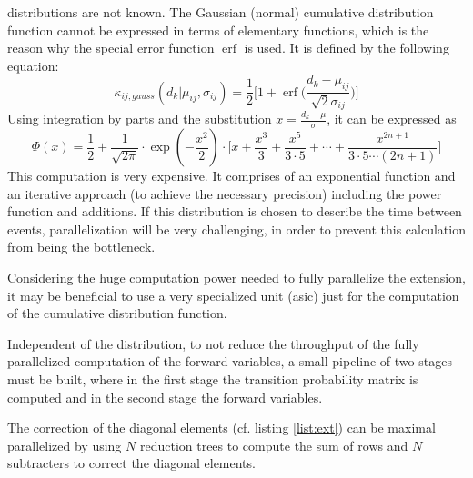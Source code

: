 \documentclass[mscthesis]{usiinfthesis}
\DeclareMathOperator{\erf}{erf}
\begin{document}
\begin{description}
        distributions are not known. The Gaussian (normal) cumulative
        distribution function cannot be expressed in terms of elementary
        functions, which is the reason why the special error function $\erf$ is
        used. It is defined by the following equation:
        \begin{equation}
            \label{eq:kernel}
            \kappa_{ij, gauss}(d_k | \mu_{ij}, \sigma_{ij}) = 
            \frac{1}{2}\bigg [1 + \erf \big (\frac{d_k - \mu_{ij}}{\sqrt 2 \sigma_{ij}}\big )
                \bigg ]
        \end{equation}
        Using integration by parts and the substitution $x
        = \frac{d_k-\mu}{\sigma}$, it can be expressed as
        \begin{equation}
            \label{eq:cdf_gauss}
            \Phi(x) = \frac{1}{2}
                + \frac{1}{\sqrt{2\pi}} \cdot \exp(-\frac{x^2}{2})
                \cdot \Bigg[ x+\frac{x^3}{3} + \frac{x^5}{3 \cdot 5} + \cdots
                + \frac{x^{2n+1}}{3 \cdot 5 \cdots (2n+1)} \Bigg]
        \end{equation}
        This computation is very expensive. It comprises of an exponential
        function and an iterative approach (to achieve the necessary precision)
        including the power function and additions. If this distribution is
        chosen to describe the time between events, parallelization will be very
        challenging, in order to prevent this calculation from being the
        bottleneck.
\end{description}

Considering the huge computation power needed to fully parallelize the
extension, it may be beneficial to use a very specialized unit (\gls{asic}) just for
the computation of the cumulative distribution function.

Independent of the distribution, to not reduce the throughput of the fully
parallelized computation of the forward variables, a small pipeline of two
stages must be built, where in the first stage the transition probability
matrix is computed and in the second stage the forward variables.

The correction of the diagonal elements (cf. listing \ref{list:ext}) can be
maximal parallelized by using $N$ reduction trees to compute the sum of rows and
$N$ subtracters to correct the diagonal elements.

\end{document}
